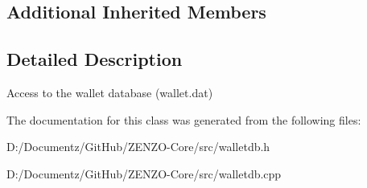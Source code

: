 \subsection*{Additional Inherited Members}


\subsection{Detailed Description}
Access to the wallet database (wallet.\+dat) 

The documentation for this class was generated from the following files\+:\begin{DoxyCompactItemize}
\item 
D\+:/\+Documentz/\+Git\+Hub/\+Z\+E\+N\+Z\+O-\/\+Core/src/walletdb.\+h\item 
D\+:/\+Documentz/\+Git\+Hub/\+Z\+E\+N\+Z\+O-\/\+Core/src/walletdb.\+cpp\end{DoxyCompactItemize}
